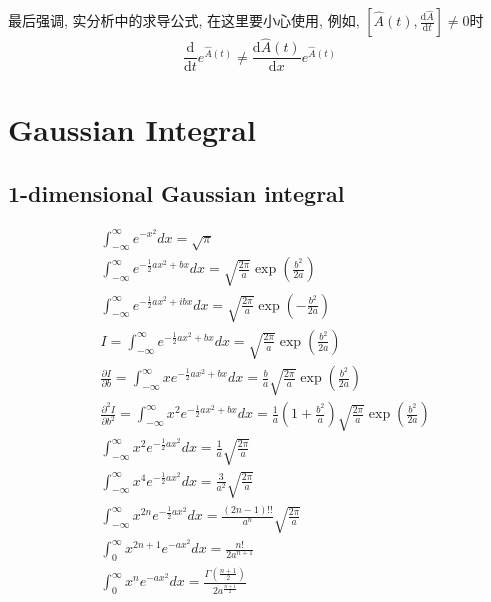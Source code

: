 最后强调, 实分析中的求导公式, 在这里要小心使用, 例如, $\left[\hat{A}(t),\frac{\mathrm{d}\hat{A}}{\mathrm{d}t}\right]\neq 0$时
\[\frac{\mathrm{d} }{\mathrm{d} t}e^{\hat{A}(t) }\neq\frac{\mathrm{d} \hat{A}(t)}{\mathrm{d} x}e^{\hat{A}(t) }\]


\chapter{Gaussian Integral}
\section*{1-dimensional Gaussian integral}
\begin{center}
    \begin{equation*}
        \begin{aligned}
            &\int_{-\infty}^{\infty} e^{-x^{2}} d x=\sqrt{\pi}\\
            &\int_{-\infty}^{\infty} e^{-\frac{1}{2} a x^{2}+b x} d x=\sqrt{\frac{2 \pi}{a}} \exp \left(\frac{b^{2}}{2 a}\right)\\
            &\int_{-\infty}^{\infty} e^{-\frac{1}{2} a x^{2}+i b x} d x=\sqrt{\frac{2 \pi}{a}} \exp \left(-\frac{b^{2}}{2 a}\right)\\
            &I=\int_{-\infty}^{\infty} e^{-\frac{1}{2} a x^{2}+b x} d x=\sqrt{\frac{2 \pi}{a}} \exp \left(\frac{b^{2}}{2 a}\right)\\
            &\frac{\partial I}{\partial b}=\int_{-\infty}^{\infty} x e^{-\frac{1}{2} a x^{2}+b x} d x=\frac{b}{a} \sqrt{\frac{2 \pi}{a}} \exp \left(\frac{b^{2}}{2 a}\right)\\
            &\frac{\partial^{2} I}{\partial b^{2}}=\int_{-\infty}^{\infty} x^{2} e^{-\frac{1}{2} a x^{2}+b x} d x=\frac{1}{a}\left(1+\frac{b^{2}}{a}\right) \sqrt{\frac{2 \pi}{a}} \exp \left(\frac{b^{2}}{2 a}\right)\\
            &\int_{-\infty}^{\infty} x^{2} e^{-\frac{1}{2} a x^{2}} d x=\frac{1}{a} \sqrt{\frac{2 \pi}{a}}\\
            &\int_{-\infty}^{\infty} x^{4} e^{-\frac{1}{2} a x^{2}} d x=\frac{3}{a^{2}} \sqrt{\frac{2 \pi}{a}}\\
            &\int_{-\infty}^{\infty} x^{2 n} e^{-\frac{1}{2} a x^{2}} d x=\frac{(2 n-1) ! !}{a^{n}} \sqrt{\frac{2 \pi}{a}}\\
            &\int_{0}^{\infty} x^{2 n+1} e^{-a x^{2}} d x=\frac{n !}{2 a^{n+1}}\\
            &\int_{0}^{\infty} x^{n} e^{-a x^{2}} d x=\frac{\Gamma\left(\frac{n+1}{2}\right)}{2 a^{\frac{n+1}{2}}}
        \end{aligned}
    \end{equation*}
\end{center}
